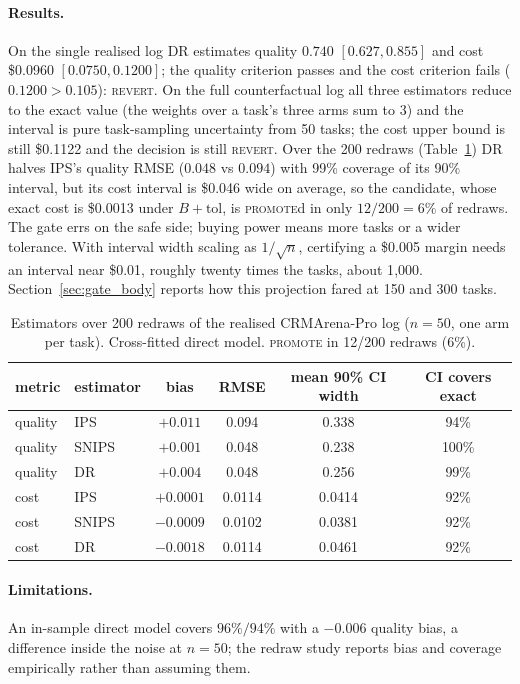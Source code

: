 \documentclass[10pt]{article}
\newcommand{\PROMOTE}{\textsc{promote}}
\newcommand{\REVERT}{\textsc{revert}}
\begin{document}
\paragraph{Results.} On the single realised log DR estimates quality $0.740$ $[0.627,0.855]$ and cost \$0.0960 $[0.0750,0.1200]$; the quality criterion passes and the cost criterion fails ($0.1200>0.105$): \REVERT. On the full counterfactual log all three estimators reduce to the exact value (the weights over a task's three arms sum to 3) and the interval is pure task-sampling uncertainty from 50 tasks; the cost upper bound is still \$0.1122 and the decision is still \REVERT. Over the 200 redraws (Table~\ref{tab:redraw}) DR halves IPS's quality RMSE ($0.048$ vs $0.094$) with 99\% coverage of its 90\% interval, but its cost interval is \$0.046 wide on average, so the candidate, whose exact cost is \$0.0013 under $B+\mathrm{tol}$, is \PROMOTE{}d in only $12/200=6\%$ of redraws. The gate errs on the safe side; buying power means more tasks or a wider tolerance. With interval width scaling as $1/\sqrt n$, certifying a \$0.005 margin needs an interval near \$0.01, roughly twenty times the tasks, about 1{,}000. Section~\ref{sec:gate_body} reports how this projection fared at 150 and 300 tasks.

\begin{table}[htbp]
\centering\small
\caption{Estimators over 200 redraws of the realised CRMArena-Pro log ($n=50$, one arm per task). Cross-fitted direct model. \PROMOTE{} in 12/200 redraws (6\%).}
\label{tab:redraw}
\begin{tabular}{llcccc}
\toprule
metric & estimator & bias & RMSE & mean 90\% CI width & CI covers exact \\
\midrule
quality & IPS & $+0.011$ & 0.094 & 0.338 & 94\% \\
quality & SNIPS & $+0.001$ & 0.048 & 0.238 & 100\% \\
quality & DR & $+0.004$ & 0.048 & 0.256 & 99\% \\
cost & IPS & $+0.0001$ & 0.0114 & 0.0414 & 92\% \\
cost & SNIPS & $-0.0009$ & 0.0102 & 0.0381 & 92\% \\
cost & DR & $-0.0018$ & 0.0114 & 0.0461 & 92\% \\
\bottomrule
\end{tabular}
\end{table}

\paragraph{Limitations.} An in-sample direct model covers $96\%/94\%$ with a $-0.006$ quality bias, a difference inside the noise at $n=50$; the redraw study reports bias and coverage empirically rather than assuming them.
\end{document}
